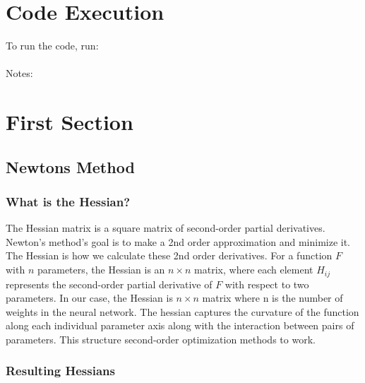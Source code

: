 \documentclass{article}
\begin{document}
\section*{Code Execution}

To run the code, run: \\ \\
Notes: 

\section*{First Section}

\subsection{Newtons Method}

\subsubsection{What is the Hessian?}
The Hessian matrix is a square matrix of second-order partial derivatives. Newton's method's goal is to make a 2nd order approximation and minimize it. The Hessian is how we calculate these 2nd order derivatives. For a function \( F \) with \( n \) parameters, the Hessian is an \( n \times n \) matrix, where each element \( H_{ij} \) represents the second-order partial derivative of \( F \) with respect to two parameters. In our case, the Hessian is \( n \times n \) matrix where n is the number of weights in the neural network. The hessian captures the curvature of the function along each individual parameter axis along with the interaction between pairs of parameters. This structure second-order optimization methods to work. 
\subssection{}
\subsubsection{Resulting Hessians}
\end{document}
